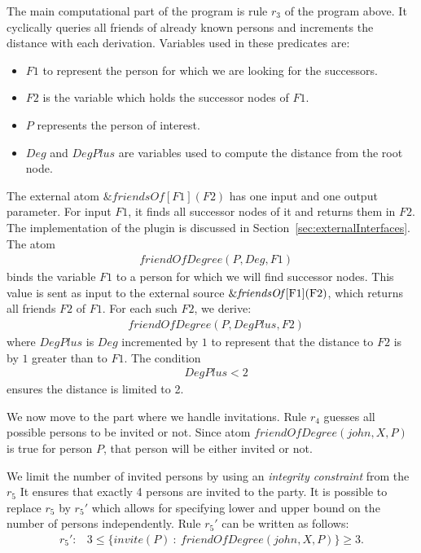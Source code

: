 \documentclass[a4paper, titlepage]{article}
\newcommand{\ext}[3]{\ensuremath{\&{#1}[#2](#3)}}
\begin{document}
The main computational part of the program is rule $r_3$ of 
the program above. It cyclically queries all  friends of 
already known persons and increments the distance with each 
derivation. Variables used in these predicates are: 

\begin{itemize}
\item $\mathit{F1}$ to represent the person for which we are 
looking for the successors.

\item $\mathit{F2}$ is the variable which holds the successor 
nodes of $F1$. 

\item $P$ represents the person of interest.

\item $\mathit{Deg}$ and $DegPlus$ are variables used to 
compute the distance from the root node.
\end{itemize}
The external atom \ext{friendsOf}{F1}{F2} has one input and 
one output parameter. For input $\mathit{F1}$, 
it finds all successor nodes of it and returns them in 
$\mathit{F2}$. The implementation of the plugin is 
discussed in Section~\ref{sec:externalInterfaces}. The atom
\begin{align*}
& \mathit{friendOfDegree(P, Deg, F1)}
\end{align*}
binds the variable $\mathit{F1}$ to a person for which we 
will find successor nodes. This value is sent as input to 
the external source \ext{\mathit{friendsOf}}{$F1$}{$F2$}, 
which returns all friends $F2$ of $F1$. For each such $F2$, 
we derive:
\begin{align*}
& \mathit{friendOfDegree(P, DegPlus, F2)}
\end{align*} 
where $\mathit{DegPlus}$ is $\mathit{Deg}$ incremented by 
$1$ to represent that the distance to $F2$ is by $1$ 
greater than to $F1$. The condition
\begin{align*}
& \mathit{DegPlus < 2}
\end{align*}
ensures the distance is limited to 2. 

We now move to the part where we handle invitations. Rule $r_4$ guesses all possible 
persons to be invited or not. Since atom 
$\mathit{friendOfDegree(john, X, P)}$ is true for person $P$, that person will be either invited or not.

We limit the number of invited persons by using an 
\emph{integrity constraint} from the $r_5$
It ensures that exactly 4 persons are invited to the party. 
It is possible to replace $r_5$ by $r_5 \prime $ which allows for specifying 
lower and upper bound on the number of persons independently. Rule $r_5 \prime $ can be written as follows:
\begin{align*}
r_5 \prime  \colon & 3 \leq \{ invite(P) \ \colon \ friendOfDegree(john,X,P)\} \geq 3.
\end{align*} 
  
\end{document}
